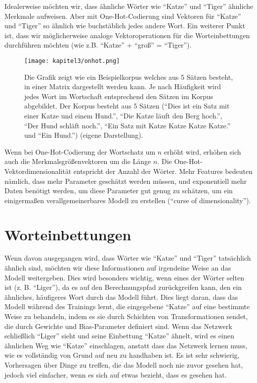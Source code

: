 Idealerweise möchten wir, dass ähnliche Wörter wie \enquote{Katze} und \enquote{Tiger} ähnliche Merkmale aufweisen. Aber mit One-Hot-Codierung sind Vektoren für \enquote{Katze}  und \enquote{Tiger} so ähnlich wie buchstäblich jedes andere Wort. Ein weiterer Punkt ist, dass wir möglicherweise analoge Vektoroperationen für die Worteinbettungen durchführen möchten (wie z.B. \enquote{Katze} + \enquote{groß} = \enquote{Tiger}).

\begin{figure}[H]
    \centering
    \texttt{[image: kapitel3/onhot.png]}
    \caption[One-Hot-Codierung als Eingabematrix]{Die Grafik zeigt wie ein Beispielkorpus welches aus 5 Sätzen besteht, in einer Matrix dargestellt werden kann. Je nach Häufigkeit wird jedes Wort im Wortschaft entsprechend den Sätzen im Korpus abgebildet. Der Korpus besteht aus 5 Sätzen (\enquote{Dies ist ein Satz mit einer Katze und einem Hund.}, \enquote{Die Katze läuft den Berg hoch.}, \enquote{Der Hund schläft noch.}, \enquote{Ein Satz mit Katze Katze Katze Katze.} und \enquote{Ein Hund.}) (eigene Darstellung).}
    \label{OneHotGrafik}
\end{figure}

Wenn bei One-Hot-Codierung der Wortschatz um $n$ erhöht wird, erhöhen sich auch die Merkmalsgrößenvektoren um die Länge $n$. Die One-Hot-Vektordimensionalität entspricht der Anzahl der Wörter. Mehr Features bedeuten nämlich, dass mehr Parameter geschätzt werden müssen, und exponentiell mehr Daten benötigt werden, um diese Parameter gut genug zu schätzen, um ein einigermaßen verallgemeinerbares Modell zu erstellen (\enquote{curse of dimensionality}).

\section{Worteinbettungen}
Wenn davon ausgegangen wird, dass Wörter wie \enquote{Katze} und \enquote{Tiger} tatsächlich ähnlich sind, möchten wir diese Informationen auf irgendeine Weise an das Modell weitergeben. Dies wird besonders wichtig, wenn eines der Wörter selten ist (z. B. \enquote{Liger}), da es auf den Berechnungspfad zurückgreifen kann, den ein ähnliches, häufigeres Wort durch das Modell führt. Dies liegt daran, dass das Modell während des Trainings lernt, die eingegebene \enquote{Katze} auf eine bestimmte Weise zu behandeln, indem es sie durch Schichten von Transformationen sendet, die durch Gewichte und Bias-Parameter definiert sind. Wenn das Netzwerk schließlich \enquote{Liger} sieht und seine Einbettung \enquote{Katze} ähnelt, wird es einen ähnlichen Weg wie \enquote{Katze} einschlagen, anstatt dass das Netzwerk lernen muss, wie es vollständig von Grund auf neu zu handhaben ist. Es ist sehr schwierig, Vorhersagen über Dinge zu treffen, die das Modell noch nie zuvor gesehen hat, jedoch viel einfacher, wenn es sich auf etwas bezieht, dass es gesehen hat.


